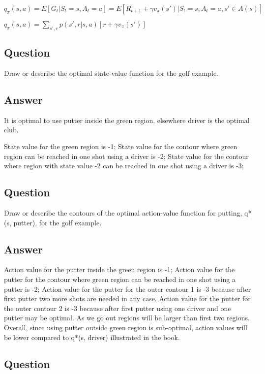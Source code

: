 \documentclass[11pt]{article}
\begin{document}
    $ q_{\pi}(s, a) = E[G_{t}|S_{t}=s, A_{t}=a] = E[R_{t+1} + \gamma v_{\pi}(s') |S_{t}=s, A_{t}=a, s' \in A(s)] $

    $ q_{\pi}(s, a) = \sum_{s',r} p(s', r | s, a) [r + \gamma v_{\pi}(s')] $

    \subsection{Question}

    Draw or describe the optimal state-value function for the golf example.

    \subsection*{Answer}

    It is optimal to use putter inside the green region, elsewhere driver is the optimal club.

    State value for the green region is -1;
    State value for the contour where green region can be reached in one shot using a driver is -2;
    State value for the contour where region with state value -2 can be reached in one shot using a driver is -3;

    \subsection{Question}

    Draw or describe the contours of the optimal action-value function for putting, q*(s, putter), for the golf example.

    \subsection*{Answer}

    Action value for the putter inside the green region is -1;
    Action value for the putter for the contour where green region can be reached in one shot using a putter is -2;
    Action value for the putter for the outer contour 1 is -3 because after first putter two more shots are needed in any case.
    Action value for the putter for the outer contour 2 is -3 because after first putter using one driver and one putter may be optimal.
    As we go out regions will be larger than first two regions.
    Overall, since using putter outside green region is sub-optimal, action values will be lower compared to q*(s, driver) illustrated in the book.

    \subsection{Question}
\end{document}
